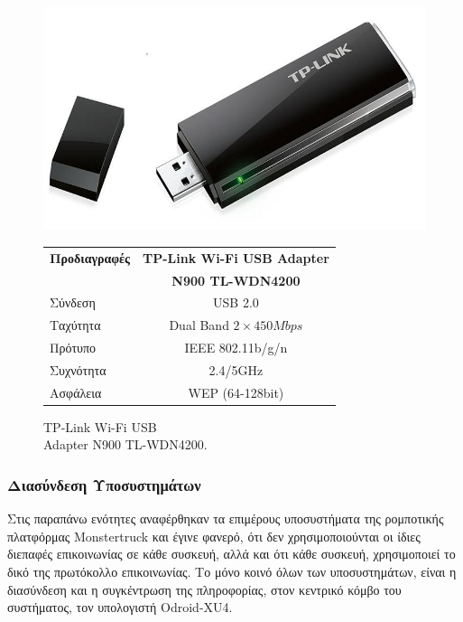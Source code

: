\bigskip
\begin{figure}[!ht]
	\begin{minipage}[b]{0.4\textwidth}
		\centering
		\includegraphics[width=0.6\linewidth]{Chapters/Chapter2/Figures/wifi_adapter.jpg}
		\caption{TP-Link Wi-Fi USB\\ Adapter N900 TL-WDN4200.}
		\label{fig:wifi_adapter}
	\end{minipage}		
	\begin{minipage}[b]{0.5\textwidth}
		\centering
		\begin{tabular}{| l | c |}
			\hline
			\textbf{Προδιαγραφές} & \textbf{TP-Link Wi-Fi USB Adapter}\\
			 &  \textbf{N900 TL-WDN4200}\\ \hline
			Σύνδεση & USB 2.0 \\ \hline
			Ταχύτητα & Dual Band $2 \times 450Mbps$\\ \hline
			Πρότυπο & IEEE 802.11b/g/n\\ \hline
			Συχνότητα & 2.4/5GHz\\ \hline
			Ασφάλεια & WEP (64-128bit)\\ \hline
		\end{tabular}
		\label{tab:wifi_adapter_specs}
	\end{minipage}
\end{figure}


\bigskip
\subsubsection{Διασύνδεση Υποσυστημάτων} \label{sssec:interconnections}
Στις παραπάνω ενότητες αναφέρθηκαν τα επιμέρους υποσυστήματα της ρομποτικής πλατφόρμας {Monstertruck} και έγινε φανερό, ότι δεν χρησιμοποιούνται οι ίδιες διεπαφές επικοινωνίας σε κάθε συσκευή, αλλά και ότι κάθε συσκευή, χρησιμοποιεί το δικό της πρωτόκολλο επικοινωνίας. Το μόνο κοινό όλων των υποσυστημάτων, είναι η διασύνδεση και η συγκέντρωση της πληροφορίας, στον κεντρικό κόμβο του συστήματος, τον υπολογιστή {Odroid-XU4}.

